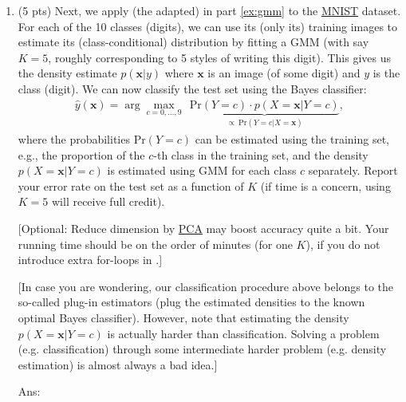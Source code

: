\documentclass[10pt,letter,notitlepage]{article}
\newcommand{\xv}{\mathbf{x}}
\newcommand{\red}[1]{{\color{red}#1}}
\newcommand{\magenta}[1]{{\color{magenta}#1}}
\newcommand{\eg}{{e.g.}\xspace}
\newcommand{\ans}[1]{{\color{orange}\textsf{Ans}: #1}}
\newcounter{exercise}
\begin{document}
\begin{exercise}
\begin{enumerate}[label=\alph*)]
  \item (5 pts) Next, we apply (the adapted)  in part \ref{ex:gmm} to the \href{https://pytorch.org/vision/0.9/datasets.html#mnist}{\magenta{MNIST}} dataset. For each of the 10 classes (digits), we can use its (only its) training images to estimate its (class-conditional) distribution by fitting a GMM (with say $K=5$, roughly corresponding to 5 styles of writing this digit). This gives us the density estimate $p(\xv | y)$ where $\xv$ is an image (of some digit) and $y$ is the class (digit). We can now classify the test set using the Bayes classifier:
		\begin{align}
		\hat y(\xv) = \arg\max_{c = 0, \ldots, 9} ~~ \underbrace{\mathrm{Pr}(Y = c) \cdot p(X = \xv | Y = c)}_{\propto ~\mathrm{Pr}(Y=c | X=\xv)},
		\end{align}
		where the probabilities $\mathrm{Pr}(Y = c)$ can be estimated using the training set, \eg, the proportion of the $c$-th class in the training set, and the \red{density} $p(X = \xv | Y = c)$ is estimated using GMM for each class $c$ separately. Report your error rate on the test set as a function of $K$ (if time is a concern, using $K=5$ will receive  full credit).

		[Optional: Reduce dimension by \href{https://en.wikipedia.org/wiki/Principal_component_analysis}{\magenta{PCA}} may boost accuracy quite a bit. Your running time should be on the order of minutes (for one $K$), if you do not introduce extra for-loops in .]

		[In case you are wondering, our classification procedure above belongs to the so-called plug-in estimators (plug the estimated densities to the known optimal Bayes classifier). However, note that estimating the density $p(X=\xv | Y = c)$ is actually harder than classification. Solving a problem (\eg classification) through some intermediate harder problem (\eg density estimation) is almost always a bad idea.]

		\ans{}


	\end{enumerate}
\end{exercise}
\end{document}
